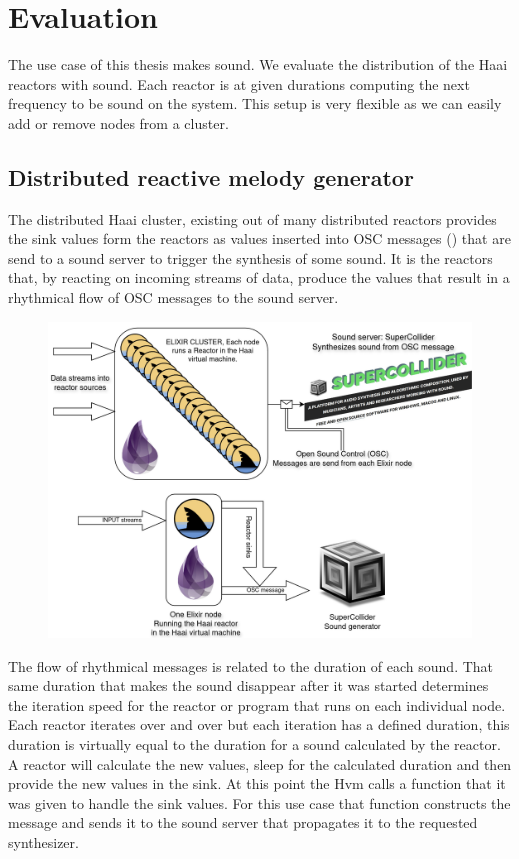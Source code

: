 \documentclass[a4paper]{book}
\begin{document}
\chapter{Evaluation}

The use case of this thesis makes sound. We evaluate the distribution of the Haai reactors with sound. Each reactor is at given durations computing the next frequency to be sound on the system. This setup is very flexible as we can easily add or remove nodes from a cluster.   

\section{Distributed reactive melody generator}
The distributed Haai cluster, existing out of many distributed reactors provides the sink values form the reactors as values inserted into OSC messages (\cite{schmeder2010best}) that are send to a sound server to trigger the synthesis of some sound. It is the reactors that, by reacting on incoming streams of data, produce the values that result in a rhythmical flow of OSC messages to the sound server. 

\begin{figure}[h]
	\includegraphics[width=\textwidth]{drmg200.drawio}
\end{figure}



 
The flow of rhythmical messages is related to the duration of each sound. That same duration that makes the sound disappear after it was started determines the iteration speed for the reactor or program that runs on each individual node. Each reactor iterates over and over but each iteration has a defined duration, this duration is virtually equal to the duration for a sound calculated by the reactor. A reactor will calculate the new values, sleep for the calculated duration and then provide the new values in the sink. At this point the Hvm calls a function that it was given to handle the sink values. For this use case that function constructs the message and sends it to the sound server that propagates it to the requested synthesizer. 
\end{document}
